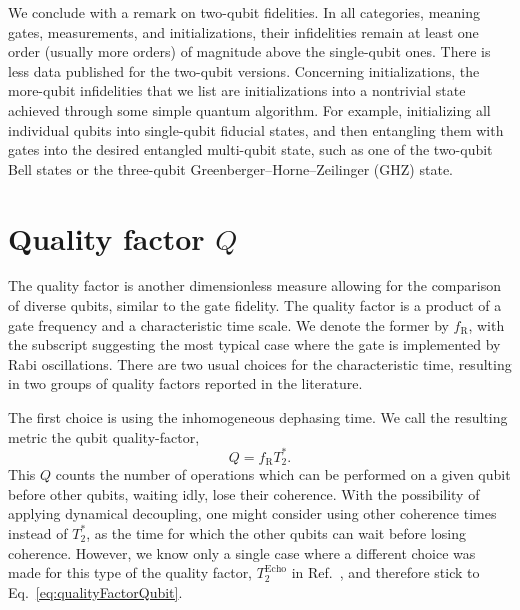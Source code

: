 \documentclass[aps, prx, showpacs, twocolumn, superscriptaddress, notitlepage, longbibliography, floatfix, nofootinbib]{revtex4-2}
\newcommand{\TEcho}{T_2^\mathrm{Echo}}
\newcommand{\recheck}[1]{{#1}}
\begin{document}
We conclude with a remark on two-qubit fidelities. \recheck{In all categories, meaning gates, measurements, and initializations, their infidelities remain at least one order (usually more orders) of magnitude above the single-qubit ones. There is less data published for the two-qubit versions.} \recheck{Concerning initializations, the more-qubit infidelities that we list are initializations into a nontrivial state achieved through some simple quantum algorithm.} For example, initializing all individual qubits into single-qubit fiducial states, and then entangling them with gates into the desired entangled multi-qubit state, such as one of the two-qubit Bell states or the three-qubit Greenberger–Horne–Zeilinger (GHZ) state. 


\section{Quality factor $Q$}

\label{sec:qualityFactor}

The quality factor is another dimensionless measure allowing for the comparison of diverse qubits, similar to the gate fidelity. The quality factor is a product of a gate frequency and a characteristic time scale. We denote the former by $f_\mathrm{R}$, with the subscript suggesting the most typical case where the gate is implemented by Rabi oscillations. There are two usual choices for the characteristic time, resulting in two groups of quality factors reported in the literature. 

The first choice is using the inhomogeneous dephasing time. We call the resulting metric the qubit quality-factor,
\begin{equation}
Q = f_\mathrm{R} T_2^*.
\label{eq:qualityFactorQubit}
\end{equation}
This $Q$ counts the number of operations which can be performed on a given qubit before other qubits, waiting idly, lose their coherence. With the possibility of applying dynamical decoupling, one might consider using other coherence times instead of $T_2^*$, as the time for which the other qubits can wait before losing coherence. However, we know only a single case where a different choice was made for this type of the quality factor, $ \TEcho$ in Ref.~\cite{dial_charge_2013}, and therefore stick to Eq.~\eqref{eq:qualityFactorQubit}. 
\end{document}
